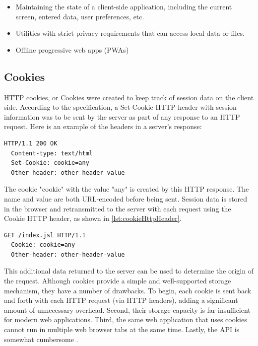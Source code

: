 \begin{itemize}
  \item Maintaining the state of a client-side application, including the current screen, entered data, user preferences, etc.
  \item Utilities with strict privacy requirements that can access local data or files.
  \item Offline progressive web apps (PWAs)
\end{itemize}

\subsection*{Cookies}
HTTP cookies, or Cookies were created to keep track of session data on the client side. According to the specification, a Set-Cookie HTTP header with session information was to be sent by the server as part of any response to an HTTP request. Here is an example of the headers in a server's response:

\begin{lstlisting}[language={}, caption={Cookie server response's headers}]
  HTTP/1.1 200 OK
  Content-type: text/html
  Set-Cookie: cookie=any
  Other-header: other-header-value
\end{lstlisting}

The cookie "cookie" with the value "any" is created by this HTTP response. The name and value are both URL-encoded before being sent. Session data is stored in the browser and retransmitted to the server with each request using the Cookie HTTP header, as shown in \autoref{lst:cookieHttpHeader}.

\begin{lstlisting}[language={}, caption={Cookie HTTP header}, label={lst:cookieHttpHeader}]
  GET /index.jsl HTTP/1.1
  Cookie: cookie=any
  Other-header: other-header-value
\end{lstlisting}

This additional data returned to the server can be used to determine the origin of the request. Although cookies provide a simple and well-supported storage mechanism, they have a number of drawbacks. To begin, each cookie is sent back and forth with each HTTP request (via HTTP headers), adding a significant amount of unnecessary overhead. Second, their storage capacity is far insufficient for modern web applications. Third, the same web application that uses cookies cannot run in multiple web browser tabs at the same time. Lastly, the API is somewhat cumbersome \autocite{kessin2011programming, macdonald2013html5}.

